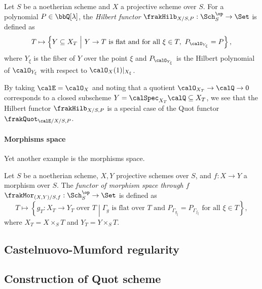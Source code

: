     \begin{definition}\label{def:Hilbert_functor}
        Let \(S\) be a noetherian scheme and \(X\) a projective scheme over \(S\).
        For a polynomial \(P \in \bbQ[\lambda]\), the \emph{Hilbert functor} \(\frakHilb_{X/S,P}:\Sch_S^\op \to \Set\) is defined as
        \[ T \mapsto \left\{ Y \subseteq X_T \ \middle|\ Y \to T \text{ is flat and for all } \xi \in T,\ P_{\calO_{Y_\xi}} = P \right\}, \]
        where \(Y_\xi\) is the fiber of \(Y\) over the point \(\xi\) and \(P_{\calO_{Y_\xi}}\) is the Hilbert polynomial of \(\calO_{Y_\xi}\) with respect to \(\calO_X(1)|_{X_\xi}\).
    \end{definition}

    By taking \(\calE = \calO_X\) and noting that a quotient \(\calO_{X_T} \to \calQ \to 0\) corresponds to a closed subscheme \(Y = \calSpec_{X_T} \calQ \subseteq X_T\), 
    we see that the Hilbert functor \(\frakHilb_{X/S,P}\) is a special case of the Quot functor \(\frakQuot_{\calE/X/S,P}\).



    \paragraph{Morphisms space} Yet another example is the morphisms space.

    \begin{definition}\label{def:functor_of_morphism_space}
        Let \(S\) be a noetherian scheme, \(X,Y\) projective schemes over \(S\), and \(f:X \to Y\) a morphism over \(S\).
        The \emph{functor of morphism space through \(f\)} \(\frakMor_{(X,Y)/S,f}:\Sch_S^\op \to \Set\) is defined as
        \[ T \mapsto \left\{ g_T:X_T \to Y_T \text{ over } T \middle| \Gamma_g \text{ is flat over } T \text{ and } P_{\Gamma_{g_\xi}} = P_{\Gamma_{f_\xi}} \text{ for all } \xi \in T \right\}, \]
        where \(X_T = X \times_S T\) and \(Y_T = Y \times_S T\).
    \end{definition}




\subsection{Castelnuovo-Mumford regularity}



\subsection{Construction of Quot scheme}
